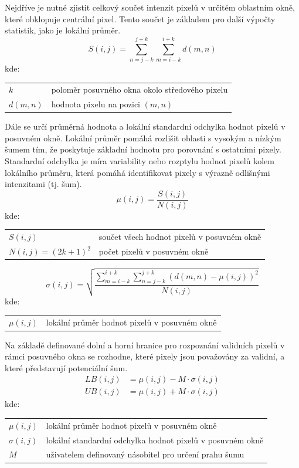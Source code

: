 \documentclass[male,czech,api_ing]{thesis}
\makeatletter
\newenvironment{conditions}[1][kde:]
    {#1 \begin{tabular}[t]{>{$}l<{$} @{${}={}$} >{\raggedright\arraybackslash}p{10cm}}}
    {\end{tabular}}
\makeatother
\begin{document}
Nejdříve je nutné zjistit celkový součet intenzit pixelů v určitém oblastním okně, které obklopuje centrální pixel. Tento součet je základem pro další výpočty statistik, jako je lokální průměr.
\begin{equation}
    S(i, j) = \sum_{n=j-k}^{j+k}\sum_{m=i-k}^{i+k} d(m, n)
\end{equation}
\begin{conditions}
    k & poloměr posuvného okna okolo středového pixelu \\
    d(m, n) & hodnota pixelu na pozici $(m, n)$
\end{conditions}

Dále se určí průměrná hodnota a lokální standardní odchylka hodnot pixelů v posuvném okně. Lokální průměr pomáhá rozlišit oblasti s vysokým a nízkým šumem tím, že poskytuje základní hodnotu pro porovnání s ostatními pixely. Standardní odchylka je míra variability nebo rozptylu hodnot pixelů kolem lokálního průměru, která pomáhá identifikovat pixely s výrazně odlišnými intenzitami (tj. šum).
\begin{equation}
    \mu(i, j) = \frac{S(i, j)}{N(i, j)}
\end{equation}
\begin{conditions}
    S(i, j) & součet všech hodnot pixelů v posuvném okně \\
    N(i, j) = (2k + 1)^2 & počet pixelů v posuvném okně
\end{conditions}

\begin{equation}
    \sigma(i, j) = \sqrt{\frac{\sum_{m=i-k}^{i+k} \sum_{n=j-k}^{j+k} (d(m, n) - \mu(i, j))^2}{N(i, j)}}
\end{equation}
\begin{conditions}
    \mu(i, j) & lokální průměr hodnot pixelů v posuvném okně
\end{conditions}

Na základě definované dolní a horní hranice pro rozpoznání validních pixelů v rámci posuvného okna se rozhodne, které pixely jsou považovány za validní, a které představují potenciální šum.
\begin{equation}
    \begin{split}
        LB(i, j) &= \mu(i, j) - M \cdot \sigma(i, j) \\
        UB(i, j) &= \mu(i, j) + M \cdot \sigma(i, j)
    \end{split}
\end{equation}
\begin{conditions}
    \mu(i, j) & lokální průměr hodnot pixelů v posuvném okně \\
    \sigma(i, j) & lokální standardní odchylka hodnot pixelů v posuvném okně \\
    M & uživatelem definovaný násobitel pro určení prahu šumu
\end{conditions}
\end{document}
